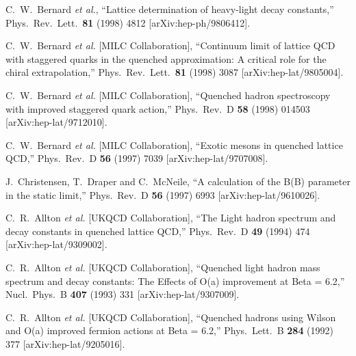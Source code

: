 \begin{thebibliography}{130}
C.~W.~Bernard {\it et al.},
``Lattice determination of heavy-light decay constants,''
Phys.\ Rev.\ Lett.\  {\bf 81} (1998) 4812
[arXiv:hep-ph/9806412].

C.~W.~Bernard {\it et al.}  [MILC Collaboration],
``Continuum limit of lattice QCD with staggered quarks in the quenched  approximation: A critical role for the chiral extrapolation,''
Phys.\ Rev.\ Lett.\  {\bf 81} (1998) 3087
[arXiv:hep-lat/9805004].


C.~W.~Bernard {\it et al.}  [MILC Collaboration],
``Quenched hadron spectroscopy with improved staggered quark action,''
Phys.\ Rev.\ D {\bf 58} (1998) 014503
[arXiv:hep-lat/9712010].

C.~W.~Bernard {\it et al.}  [MILC Collaboration],
``Exotic mesons in quenched lattice QCD,''
Phys.\ Rev.\ D {\bf 56} (1997) 7039
[arXiv:hep-lat/9707008].

J.~Christensen, T.~Draper and C.~McNeile,
``A calculation of the B(B) parameter in the static limit,''
Phys.\ Rev.\ D {\bf 56} (1997) 6993
[arXiv:hep-lat/9610026].


C.~R.~Allton {\it et al.}  [UKQCD Collaboration],
``The Light hadron spectrum and decay constants in quenched lattice QCD,''
Phys.\ Rev.\ D {\bf 49} (1994) 474
[arXiv:hep-lat/9309002].

C.~R.~Allton {\it et al.}  [UKQCD Collaboration],
``Quenched light hadron mass spectrum and decay constants: The Effects of O(a) improvement at Beta = 6.2,''
Nucl.\ Phys.\ B {\bf 407} (1993) 331
[arXiv:hep-lat/9307009].


C.~R.~Allton {\it et al.}  [UKQCD Collaboration],
``Quenched hadrons using Wilson and O(a) improved fermion actions at Beta = 6.2,''
Phys.\ Lett.\ B {\bf 284} (1992) 377
[arXiv:hep-lat/9205016].




\end{thebibliography}

